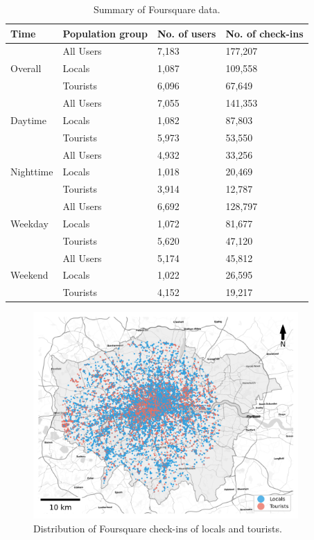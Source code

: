 \documentclass{article}
\theoremstyle{definition}
\theoremstyle{remark}
\begin{document}
\begin{table}[h!]
\centering
\caption{\label{tab:foursquare_summary}Summary of Foursquare data.}
\begin{tabular}{llll} \hline
Time & Population group & No. of users & No. of check-ins \\
\hline
\multirow{3}{*}{Overall} 
& All Users & 7,183 & 177,207 \\
& Locals & 1,087 & 109,558 \\
& Tourists & 6,096 & 67,649 \\
\hline
\multirow{3}{*}{Daytime} 
& All Users & 7,055 & 141,353 \\
& Locals & 1,082 & 87,803 \\
& Tourists & 5,973 & 53,550 \\
\hline
\multirow{3}{*}{Nighttime} 
& All Users & 4,932 & 33,256 \\
& Locals & 1,018 & 20,469 \\
& Tourists & 3,914 & 12,787 \\
\hline
\multirow{3}{*}{Weekday} 
& All Users & 6,692 & 128,797 \\
& Locals & 1,072 & 81,677 \\
& Tourists & 5,620 & 47,120 \\
\hline
\multirow{3}{*}{Weekend} 
& All Users & 5,174 & 45,812 \\
& Locals & 1,022 & 26,595 \\
& Tourists & 4,152 & 19,217 \\
\hline
\end{tabular}
\end{table}


\begin{figure}[h!]
\centering
\includegraphics[width=0.9\textwidth]{figures/foursquare_distribution.png}
\caption{\label{fig:foursquare_distribution}Distribution of Foursquare check-ins of locals and tourists.}
\end{figure}
\end{document}
